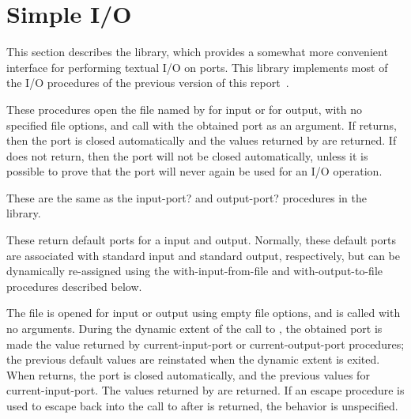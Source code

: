 \section{Simple I/O}

This section describes the  library, which
provides a somewhat more convenient interface for performing textual
I/O on ports.  This library implements most of the 
I/O procedures of the previous version of this report~\cite{R5RS}.

\begin{entry}{%
}

These procedures open the file named by  for input or
for output, with no specified file options, and call  with
the obtained port as an argument.  If  returns, then the
port is closed automatically and the values returned by  are
returned. If  does not return, then the port will not be
closed automatically, unless it is possible to prove that the port
will never again be used for an I/O operation.
\end{entry}

\begin{entry}{%
}

These are the same as the {\cf input-port?} and {\cf output-port?}
procedures in the  library.
\end{entry}

\begin{entry}{%
}

These return default ports for a input and output.  Normally, these
default ports are associated with standard input and standard output,
respectively, but can be dynamically re-assigned using the {\cf
  with-input-from-file} and {\cf with-output-to-file} procedures
described below.
\end{entry}

\begin{entry}{%
}

  The
file is opened for input or output using empty file options, and
 is called with no arguments.  During the dynamic extent of
the call to , the obtained port is made the value returned
by {\cf current-input-port} or {\cf current-output-port} procedures;
the previous default values are reinstated when the dynamic extent is
exited.  When  returns, the port is closed automatically,
and the previous values for {\cf current-input-port}.  The values
returned by  are returned.  If an escape procedure is used
to escape back into the call to  after  is
returned, the behavior is unspecified.
\end{entry}

